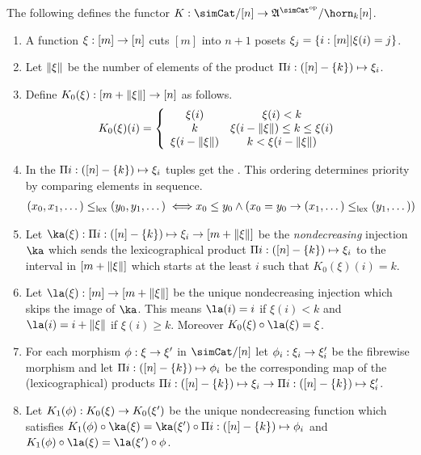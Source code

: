 \documentclass[csh.tex]{subfiles}
\begin{document}
\begin{definition}
The following defines the functor $K\of\simCat/[n]\to\ambient\s/\horn_k[n]$.
\begin{enumerate}
\item A function $\xi:[m]\to[n]$ cuts $[m]$ into $n+1$ posets $\xi_j = \left\{i:[m]|\xi(i)=j\right\}$. 
\item Let $\Vert \xi \Vert$ be the number of elements of the product $\Pi i: ([n]-\left\{k\right\}) \mapsto{\xi_i}$. 
\item Define $K_0(\xi): [m+\Vert \xi \Vert]\to [n]$ as follows.
\[ 
	K_0(\xi)(i) = \left\{
		\begin{array}{cc}
			\xi(i) & \xi(i)<k \\
			k & \xi(i-\Vert \xi \Vert)\leq k \leq \xi(i)\\
			\xi(i-\Vert \xi \Vert) & k<\xi(i-\Vert \xi \Vert)
		\end{array}
	\right.
\]

\item In the  $\Pi i:([n]-\left\{k\right\}) \mapsto{\xi_i}$ tuples get the . This ordering determines priority by comparing elements in sequence.
\begin{align*} 
(x_0,x_1,\dotsc) \leq_{\rm lex} (y_0,y_1,\dotsc) \iff& x_0\leq y_0 \land (x_0=y_0 \to (x_1,\dotsc)\leq_{\rm lex}(y_1,\dotsc))
\end{align*}

\item Let $\ka(\xi)\of\product{i\of([n]-\set k)}{\xi_i} \to [m+\norm\xi]$ be the \emph{nondecreasing} injection $\ka$ which sends the lexicographical product $\Pi i:([n]-\left\{k\right\}) \mapsto{\xi_i}$ to the interval in $[m+\Vert \xi \Vert]$ which starts at the least $i$ such that $K_0(\xi)(i)=k$.

\item Let $\la(\xi)\of[m]\to[m+\norm\xi]$ be the unique nondecreasing injection which skips the image of $\ka$. This means $\la(i)=i$ if $\xi(i)<k$ and $\la(i)=i+\norm\xi$ if $\xi(i)\geq k$. Moreover $K_0(\xi)\circ\la(\xi) = \xi$.
\item For each morphism $\phi:\xi\to\xi'$ in $\simCat/[n]$ let $\phi_i:\xi_i\to\xi'_i$ be the fibrewise morphism and let $\Pi i:([n]-\left\{k\right\}) \mapsto{\phi_i}$ be the corresponding map of the (lexicographical) products $\Pi i:([n]-\left\{k\right\}) \mapsto{\xi_i}\to\Pi i:([n]-\left\{k\right\}) \mapsto{\xi'_i}$.
\item Let $K_1(\phi): K_0(\xi)\to K_0(\xi')$ be the unique nondecreasing function which satisfies $K_1(\phi)\circ \ka(\xi) = \ka(\xi')\circ \product{i\of([n]-\set k)}{\phi_i}$ and $K_1(\phi)\circ \la(\xi) = \la(\xi')\circ \phi$.
\end{enumerate}


\end{definition}
\end{document}
